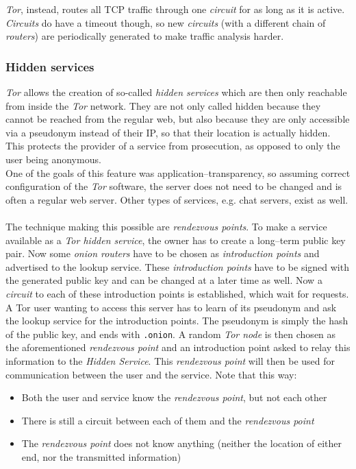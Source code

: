 \documentclass{sig-alternate}
\begin{document}
\emph{Tor}, instead, routes all TCP traffic through one \emph{circuit} for as long as it is active.
\emph{Circuits} do have a timeout though, so new \emph{circuits} (with a different chain of \emph{routers})
are periodically generated to make traffic analysis harder.

\subsubsection{Hidden services}
\emph{Tor} allows the creation of so-called \emph{hidden services} which are then only reachable from inside
the \emph{Tor} network.
They are not only called hidden because they cannot be reached from the regular web, but also because they
are only accessible via a pseudonym instead of their IP, so that their location is actually hidden.
This protects the provider of a service from prosecution, as opposed to only the user being anonymous\cite{biryukov2013}.
\\
One of the goals of this feature was application--transparency, so assuming correct configuration of the
\emph{Tor} software, the server does not need to be changed and is often a regular web
server\cite{tor2004}.
Other types of services, e.g. chat servers, exist as well\cite{biryukov2013}.
\\
\\
The technique making this possible are \emph{rendezvous points}.
To make a service available as a \emph{Tor hidden service}, the owner has to create a long--term public key pair.
Now some \emph{onion routers} have to be chosen as \emph{introduction points} and advertised to the lookup service.
These \emph{introduction points} have to be signed with the generated public key and can be changed at a later time as well.
Now a \emph{circuit} to each of these introduction points is established, which wait for requests.
\\
A Tor user wanting to access this server has to learn of its pseudonym and ask the lookup service for the introduction points.
The pseudonym is simply the hash of the public key, and ends with \texttt{.onion}.
A random \emph{Tor node} is then chosen as the aforementioned \emph{rendezvous point} and an introduction point asked to relay this information to the \emph{Hidden Service}.
This \emph{rendezvous point} will then be used for communication between the user and the service.
Note that this way:
\begin{itemize}
\item{Both the user and service know the \emph{rendezvous point}, but not each other}
\item{There is still a circuit between each of them and the \emph{rendezvous point}}
\item{The \emph{rendezvous point} does not know anything (neither the location of either end, nor the transmitted information)}
\end{itemize}
\cite{syverson2006}
\end{document}
